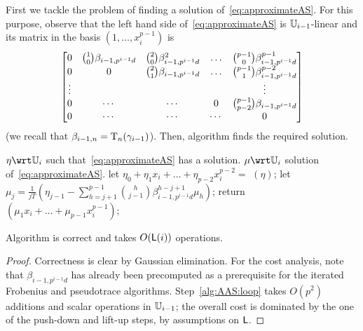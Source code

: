 First we tackle the problem of finding a solution
of~\eqref{eq:approximateAS}.  For this purpose, observe that the left
hand side of~\eqref{eq:approximateAS} is $\mathbb{U}_{i-1}$-linear and its
matrix in the basis $(1,\ldots,x_i^{p-1})$ is
\begin{equation}
  \pdfmctwo{More entries in the matrix.}
  \label{eq:approximate-matrix}
  \begin{bmatrix}
    0 & \binom{1}{0}\beta_{i-1,p^{i-1}d} & \binom{2}{0}\beta_{i-1,p^{i-1}d}^2 & \hdots & \binom{p-1}{0}\beta_{i-1,p^{i-1}d}^{p-1} \\
    0 & 0 & \binom{2}{1}\beta_{i-1,p^{i-1}d} & \hdots & \binom{p-1}{1}\beta_{i-1,p^{i-1}d}^{p-2}\\
    \vdots  &&         &        & \vdots               \\
    0 & \cdots & \cdots  & 0      &\binom{p-1}{p-2}\beta_{i-1,p^{i-1}d} \\
    0 & \cdots & \cdots  & \cdots & 0
  \end{bmatrix}
\end{equation}
(we recall that $\beta_{i-1,n}=\operatorname{T}_{n}(\gamma_{i-1})$).  Then,
algorithm  finds the required solution.



\begin{algorithm}
  \caption{} 
  \label{alg:approximateas}
  \begin{algorithmic}[1]
    \REQUIRE $\eta\wrt\U_i$ such that~\eqref{eq:approximateAS} has a solution.
    \ENSURE $\mu\wrt\U_i$ solution of~\eqref{eq:approximateAS}.
    \STATE let $\eta_0 + \eta_1 x_i + \dots + \eta_{p-2} x_i^{p-2}=$ $(\eta)$;
    \STATE let $\mu_j =
   \frac{1}{jT}\left(\eta_{j-1} -
     \sum_{h=j+1}^{p-1}\binom{h}{j-1}\beta_{i-1,p^{i-1}d}^{h-j+1}\mu_h\right)$;
   \ENDFOR
   \STATE return $(\mu_1 x_i + \ldots + \mu_{p-1} x_i^{p-1})$;
\end{algorithmic}
\end{algorithm}


\begin{theorem}
  \label{th:approximateAS}
  Algorithm  is correct and takes
  $O(\mathsf{L}(i))$ operations.
\end{theorem}

\begin{proof}
  Correctness is clear by Gaussian elimination.  For the cost
  analysis, note that $\beta_{i-1,p^{i-1}d}$ has already been
  precomputed as a prerequisite for the iterated Frobenius and
  pseudotrace algorithms. Step~\ref{alg:AAS:loop} takes $O(p^2)$
  additions and scalar operations in $\mathbb{U}_{i-1}$; the overall cost is
  dominated by the one of the push-down and lift-up steps, by
  assumptions on $\mathsf{L}$.
\end{proof}

